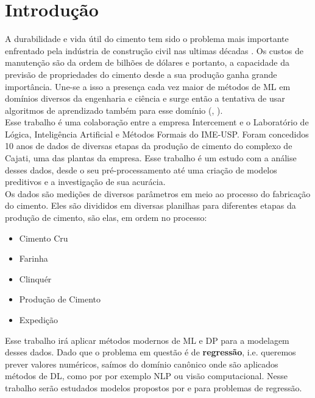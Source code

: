 \chapter{Introdução}
\label{cap:introducao}


A durabilidade e vida útil do cimento tem sido o problema mais importante enfrentado pela indústria de construção civil nas ultimas décadas \citep{cementml}. Os custos de manutenção são da ordem de bilhões de dólares e portanto, a capacidade da previsão de propriedades do cimento desde a sua produção ganha grande importância. Une-se a isso a presença cada vez maior de métodos de ML em domínios diversos da engenharia e ciência e surge então a tentativa de usar algoritmos de aprendizado também para esse domínio (\cite{cementnn1}, \cite{cementnn2}). \\ 

Esse trabalho é uma colaboração entre a empresa Intercement e o Laboratório de
Lógica, Inteligência Artificial e Métodos Formais do IME-USP. Foram concedidos
10 anos de dados de diversas etapas da produção de cimento do complexo de
Cajati, uma das plantas da empresa. Esse trabalho é um estudo com a análise
desses dados, desde o seu pré-processamento até uma criação de modelos
preditivos e a investigação de sua acurácia. \\


Os dados são medições de diversos parâmetros em meio ao processo do fabricação do cimento. Eles são divididos em diversas planilhas para diferentes etapas da produção de cimento, são elas, em ordem no processo:

\begin{itemize}
        \item Cimento Cru
        \item Farinha
        \item Clinquér
        \item Produção de Cimento
        \item Expedição
\end{itemize}


Esse trabalho irá aplicar métodos modernos de ML e DP para a modelagem desses dados. Dado que o problema em questão é de \textbf{regressão}, i.e. queremos prever valores numéricos, saímos do domínio canônico onde são aplicados métodos de DL, como por por exemplo NLP ou visão computacional. Nesse trabalho serão estudados modelos propostos por \citet{ubertime} e \citet{energylstm} para problemas de regressão.

